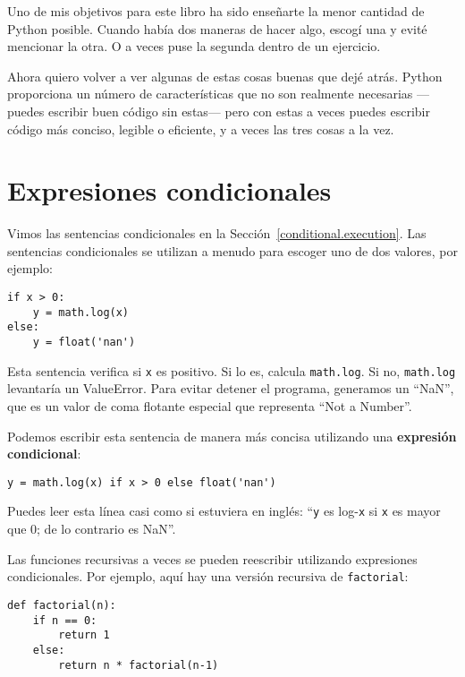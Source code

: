 \documentclass[10pt]{book}
\begin{document}
Uno de mis objetivos para este libro ha sido enseñarte la menor cantidad de Python
posible.  Cuando había dos maneras de hacer algo, escogí
una y evité mencionar la otra.  O a veces puse la segunda
dentro de un ejercicio.

Ahora quiero volver a ver algunas de estas cosas buenas que dejé atrás.
Python proporciona un número de características que no son realmente necesarias ---puedes
escribir buen código sin estas--- pero con estas a veces puedes
escribir código más conciso, legible o eficiente, y a veces
las tres cosas a la vez.


\section{Expresiones condicionales}

Vimos las sentencias condicionales en la Sección~\ref{conditional.execution}.
Las sentencias condicionales se utilizan a menudo para escoger uno de dos valores,
por ejemplo:

\begin{verbatim}
if x > 0:
    y = math.log(x)
else:
    y = float('nan')
\end{verbatim}

Esta sentencia verifica si {\tt x} es positivo.  Si lo es, calcula
{\tt math.log}.  Si no, {\tt math.log} levantaría un ValueError.  Para
evitar detener el programa, generamos un ``NaN'', que es un valor
de coma flotante especial que representa ``Not a Number''.

Podemos escribir esta sentencia de manera más concisa utilizando una {\bf expresión
condicional}:

\begin{verbatim}
y = math.log(x) if x > 0 else float('nan')
\end{verbatim}

Puedes leer esta línea casi como si estuviera en inglés: ``{\tt y} es log-{\tt x}
si {\tt x} es mayor que 0; de lo contrario es NaN''.

Las funciones recursivas a veces se pueden reescribir utilizando expresiones
condicionales.  Por ejemplo, aquí hay una versión recursiva de {\tt factorial}:

\begin{verbatim}
def factorial(n):
    if n == 0:
        return 1
    else:
        return n * factorial(n-1)
\end{verbatim}
\end{document}

